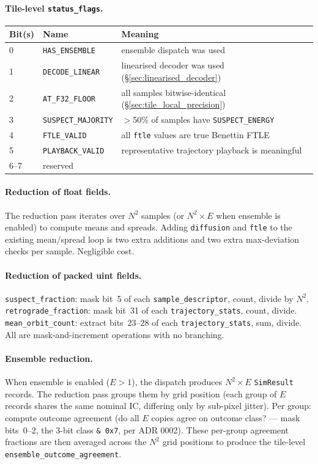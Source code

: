 \documentclass[11pt]{report}
\begin{document}
\paragraph{Tile-level \texttt{status\_flags}.}
\begin{center}
\begin{tabular}{lll}
\toprule
Bit(s) & Name & Meaning \\
\midrule
0 & \texttt{HAS\_ENSEMBLE} & ensemble dispatch was used \\
1 & \texttt{DECODE\_LINEAR} & linearised decoder was used (\S\ref{sec:linearised_decoder}) \\
2 & \texttt{AT\_F32\_FLOOR} & all samples bitwise-identical (\S\ref{sec:tile_local_precision}) \\
3 & \texttt{SUSPECT\_MAJORITY} & $>$50\% of samples have \texttt{SUSPECT\_ENERGY} \\
4 & \texttt{FTLE\_VALID} & all \texttt{ftle} values are true Benettin FTLE \\
5 & \texttt{PLAYBACK\_VALID} & representative trajectory playback is meaningful \\
6--7 & reserved & \\
\bottomrule
\end{tabular}
\end{center}

\paragraph{Reduction of float fields.} The reduction pass iterates over $N^2$ samples (or $N^2\times E$ when ensemble is enabled) to compute means and spreads. Adding \texttt{diffusion} and \texttt{ftle} to the existing mean/spread loop is two extra additions and two extra max-deviation checks per sample. Negligible cost.

\paragraph{Reduction of packed uint fields.} \texttt{suspect\_fraction}: mask bit~5 of each \texttt{sample\_descriptor}, count, divide by $N^2$. \texttt{retrograde\_fraction}: mask bit~31 of each \texttt{trajectory\_stats}, count, divide. \texttt{mean\_orbit\_count}: extract bits~23--28 of each \texttt{trajectory\_stats}, sum, divide. All are mask-and-increment operations with no branching.

\paragraph{Ensemble reduction.} When ensemble is enabled ($E>1$), the dispatch produces $N^2\times E$ \texttt{SimResult} records. The reduction pass groups them by grid position (each group of $E$ records shares the same nominal IC, differing only by sub-pixel jitter). Per group: compute outcome agreement (do all $E$ copies agree on outcome class? --- mask bits~0--2, the 3-bit class \texttt{\& 0x7}, per ADR 0002). These per-group agreement fractions are then averaged across the $N^2$ grid positions to produce the tile-level \texttt{ensemble\_outcome\_agreement}.
\end{document}
